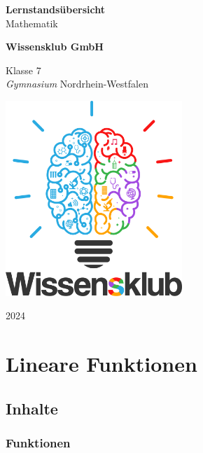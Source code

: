 \documentclass{article}
\begin{document}
\begin{titlepage}
    \begin{center}
        \vspace*{1cm}
            
        \Huge
        \textbf{Lernstandsübersicht}\\            
        \vspace{0.5cm}
        \LARGE
        Mathematik
            
        \vspace{1.5cm}
            
        \textbf{Wissensklub GmbH}
            
        \vfill
            
        Klasse 7\\
        \textit{Gymnasium} Nordrhein-Westfalen
            
        \vspace{0.8cm}
            
        \includegraphics[width=0.5\textwidth]{Wissensklub-Logo.png}
            
        \Large
        2024          
    \end{center}
\end{titlepage}

\section{Lineare Funktionen}
\subsection{Inhalte}
\subsubsection*{Funktionen}
\end{document}
